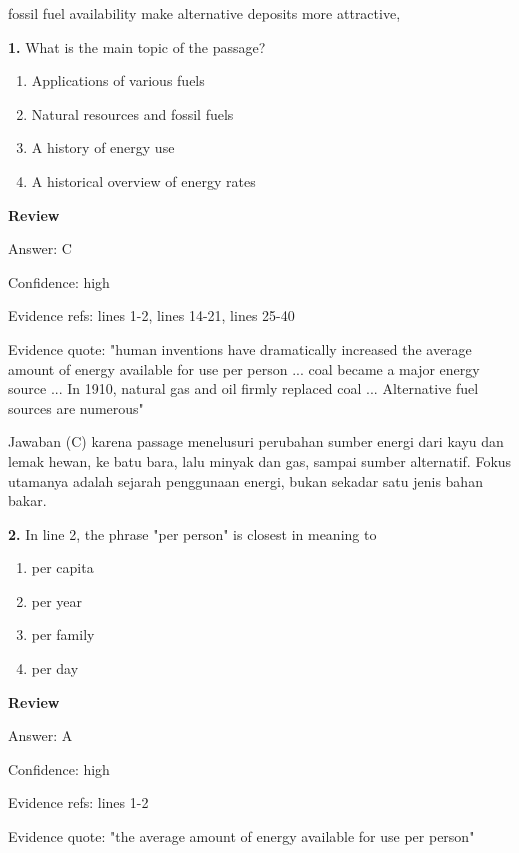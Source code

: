 \documentclass[12pt]{article}
\begin{document}
fossil fuel availability make alternative deposits more attractive,\par
\endgroup
\medskip
\noindent\textbf{1.} What is the main topic of the passage?
\begin{enumerate}[label=(\Alph*),leftmargin=*,itemsep=0.2em]
\item Applications of various fuels
\item Natural resources and fossil fuels
\item A history of energy use
\item A historical overview of energy rates
\end{enumerate}
\par
\begingroup
\setlength{\parskip}{0pt}
\setlength{\parindent}{0pt}
\textbf{Review}\par
Answer: C\par
Confidence: high\par
Evidence refs: lines 1-2, lines 14-21, lines 25-40\par
Evidence quote: "human inventions have dramatically increased the average amount of energy available for use per person ... coal became a major energy source ... In 1910, natural gas and oil firmly replaced coal ... Alternative fuel sources are numerous"\par
Jawaban (C) karena passage menelusuri perubahan sumber energi dari kayu dan lemak hewan, ke batu bara, lalu minyak dan gas, sampai sumber alternatif. Fokus utamanya adalah sejarah penggunaan energi, bukan sekadar satu jenis bahan bakar.\par
\endgroup
\par
\vspace{0.25\baselineskip}
\noindent\textbf{2.} In line 2, the phrase "per person" is closest in meaning to
\begin{enumerate}[label=(\Alph*),leftmargin=*,itemsep=0.2em]
\item per capita
\item per year
\item per family
\item per day
\end{enumerate}
\par
\begingroup
\setlength{\parskip}{0pt}
\setlength{\parindent}{0pt}
\textbf{Review}\par
Answer: A\par
Confidence: high\par
Evidence refs: lines 1-2\par
Evidence quote: "the average amount of energy available for use per person"\par
\end{document}

